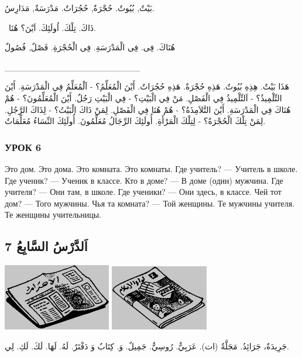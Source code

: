 \documentclass[a5paper]{article}
\begin{document}
بَيْتٌ, بُيُوتٌ. حُجْرَةٌ, حُجُرَاتٌ. مَدْرَسَةٌ, مَدَارِسُ. 

\ ذَاكَ. تِلْكَ. اُولَئِكَ. اَيْنَ؟ هُنَا.

هُنَاكَ. فِى. فِى الْمَدْرَسَةِ. فِى الْحُجْرَةِ. فَصْلٌ, فُصُولٌ

\_\_\_\_\_\_\_\_\_\_\_\_\_\_\_\_\_\_\_\_\_\_

هَذَا بَيْتٌ. هِذِهِ بُيُوتٌ. هَذِهِ حُجْرَةٌ. هَذِهِ حُجُرَاتٌ. أَيْنَ الْمُعَلِّمُ؟ - اَلْمُعَلِّمُ فِي الْمَدْرَسَةِ. أَيْنَ التِّلْمِيذُ؟ - اَلتِّلْمِيذُ فِي الْفَصْلِ. مَنْ فِي الْبَيْتِ؟ - فِي الْبَيْتِ رَجُلٌ. أَيْنَ الْمُعَلِّمُونَ؟ - هُمْ هُنَاكَ فِي الْمَدْرَسَةِ. أَيْنَ التَّلاَمِذَةُ؟ - هُمْ هُنَا فِي الْفَصْلِ. لِمَنْ ذَاكَ الْبَيْتُ؟ - لِذَاكَ الرَّجُلِ. لِمَنْ تِلْكَ الْحُجْرَةُ؟ - لِتِلْكَ الْمَرْأَةِ. أُولَئِكَ الرِّجَالُ مُعَلِّمُونَ. أُولَئِكَ النِّسَاءُ مُعَلِّمَاتٌ.

\subsubsection{УРОК 6}
Это дом. Это дома. Это комната. Это комнаты. Где учитель? — Учитель в школе. Где ученик? — Ученик в классе. Кто в доме? — В доме (один) мужчина. Где учителя? — Они там, в школе. Где ученики? — Они здесь, в классе. Чей тот дом? — Того мужчины. Чья та комната? — Той женщины. Те мужчины учителя. Те женщины учительницы.

\subsection{7 اَلدَّرْسُ السَّابِعُ}
 \includegraphics[width=1.8543in,height=1.1457in]{MuhammadBagauddinlatinized-img009.jpg}   \includegraphics[width=1.6874in,height=1.1252in]{MuhammadBagauddinlatinized-img010.jpg} 

جَرِيدَةٌ، جَرَائِدُ. مَجَلَّةٌ (ات). عَرَبِيٌّ. رُوسِيٌّ. جَمِيلٌ. وَ. كِتَابٌ وَ دَفْتَرٌ. لَهُ. لَهَا. لَكَ. لَكِ. لِي.
\end{document}
